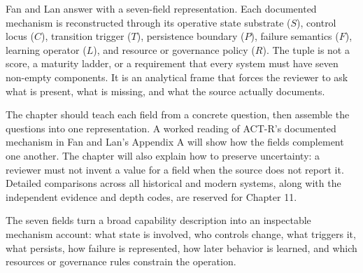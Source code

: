 Fan and Lan answer with a seven-field representation. Each documented mechanism is reconstructed through its operative state substrate ($S$), control locus ($C$), transition trigger ($T$), persistence boundary ($P$), failure semantics ($F$), learning operator ($L$), and resource or governance policy ($R$). The tuple is not a score, a maturity ladder, or a requirement that every system must have seven non-empty components. It is an analytical frame that forces the reviewer to ask what is present, what is missing, and what the source actually documents.

The chapter should teach each field from a concrete question, then assemble the questions into one representation. A worked reading of ACT-R's documented mechanism in Fan and Lan's Appendix A will show how the fields complement one another. The chapter will also explain how to preserve uncertainty: a reviewer must not invent a value for a field when the source does not report it. Detailed comparisons across all historical and modern systems, along with the independent evidence and depth codes, are reserved for Chapter 11.

\begin{takeawaybox}
The seven fields turn a broad capability description into an inspectable mechanism account: what state is involved, who controls change, what triggers it, what persists, how failure is represented, how later behavior is learned, and which resources or governance rules constrain the operation.
\end{takeawaybox}


